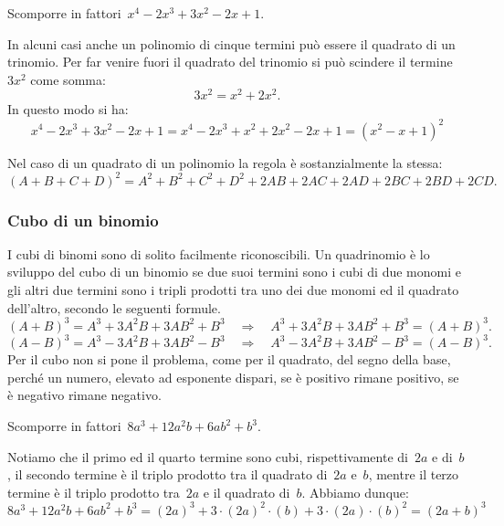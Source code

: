  \begin{esempio}
Scomporre in fattori~$x^{4}-2x^{3}+3x^{2}-2x+1$.

In alcuni casi anche un polinomio di cinque termini può essere il quadrato di 
un trinomio.
Per far venire fuori il quadrato del trinomio si può scindere il 
termine~$3x^{2}$ come somma:
\[3x^{2}=x^{2}+2x^{2}.\]
In questo modo si ha:
\[x^{4}-2x^{3}+3x^{2}-2x+1=x^{4}-2x^{3}+x^{2}+2x^{2}-2x+1=(x^{2}-x+1)^{2}\]
 \end{esempio}

Nel caso di un quadrato di un polinomio la regola è sostanzialmente la stessa:
\begin{equation*}
(A+B+C+D)^{2}=A^{2}+B^{2}+C^{2}+D^{2}+2AB+2AC+2AD+2BC+2BD+2CD.
\end{equation*}

\subsubsection{Cubo di un binomio}
\label{subsubsec:divpol_cubobin}

I cubi di binomi sono di solito facilmente riconoscibili. Un quadrinomio è lo 
sviluppo del cubo di un binomio se due suoi termini sono i cubi di due monomi 
e gli altri due termini sono i tripli prodotti tra uno dei due monomi ed il 
quadrato dell'altro, secondo le seguenti formule.
\begin{equation*}
(A+B)^{3}=A^{3}+3A^{2}B+3AB^{2}+B^{3}\quad \Rightarrow \quad 
A^{3}+3A^{2}B+3AB^{2}+B^{3}=(A+B)^{3}.
\end{equation*}
\begin{equation*}
(A-B)^{3}=A^{3}-3A^{2}B+3AB^{2}-B^{3}\quad \Rightarrow \quad 
A^{3}-3A^{2}B+3AB^{2}-B^{3}=(A-B)^{3}.
\end{equation*}
Per il cubo non si pone il problema, come per il quadrato, del segno della 
base, perché un numero, elevato ad esponente dispari, se è positivo rimane 
positivo, se è negativo rimane negativo.

 \begin{esempio}
Scomporre in fattori~$8a^{3}+12a^{2}b+6{ab}^{2}+b^{3}$.

Notiamo che il primo ed il quarto termine sono cubi, rispettivamente di~$2a$ e 
di~$b$, il secondo termine è il triplo prodotto tra il quadrato di~$2a$ e~$b$, 
mentre il terzo termine è il triplo prodotto tra~$2a$ e il quadrato di~$b$.
Abbiamo dunque:
\[8a^{3}+12a^{2}b+6ab^{2}+b^{3}=
  (2a)^{3}+3\cdot (2a)^{2}\cdot (b)+3\cdot (2a)\cdot (b)^{2}=(2a+b)^{3}\]
 \end{esempio}

